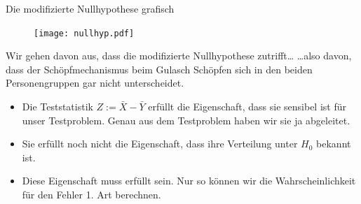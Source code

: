 \documentclass[usenames,dvipsnames,handout]{beamer}
\begin{document}
\begin{frame}{Die modifizierte Nullhypothese grafisch}
\begin{figure}[ht]
 	\centering
 	      \texttt{[image: nullhyp.pdf]}
 	\end{figure}
\end{frame}

\begin{frame}{Wir gehen davon aus, dass die modifizierte Nullhypothese zutrifft\dots}
\dots also davon, dass der Schöpfmechanismus beim Gulasch Schöpfen sich in den beiden Personengruppen gar nicht unterscheidet.
\begin{itemize}
\item{Die Teststatistik $Z:=\bar{X}-\bar{Y}$ erfüllt die Eigenschaft, dass sie sensibel ist für unser Testproblem. Genau aus dem 
Testproblem haben wir sie ja abgeleitet.}\pause
\item{Sie erfüllt noch nicht die Eigenschaft, dass ihre Verteilung unter $H_{0}$ bekannt ist.}\pause
\item{Diese Eigenschaft muss erfüllt sein. Nur so können wir die Wahrscheinlichkeit für den Fehler 1. Art berechnen.}
\end{itemize}
\end{frame}
\end{document}
